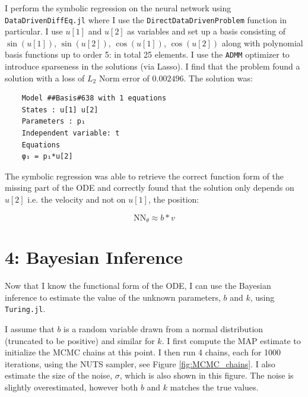 \documentclass[10pt,a4paper]{article}
\begin{document}
I perform the symbolic regression on the neural network using \texttt{DataDrivenDiffEq.jl}
where I use the \texttt{DirectDataDrivenProblem} function in particular.
I use $u[1]$ and $u[2]$ as variables and set up a basis consisting of
$\sin(u[1])$, $\sin(u[2])$, $\cos(u[1])$, $\cos(u[2])$ along with
polynomial basis functions up to order 5: in total 25 elements.
I use the \texttt{ADMM} optimizer to introduce sparseness in the solutions (via Lasso).
I find that the problem found a solution with a loss of $L_2$ Norm error of $0.002496$.
The solution was:
\begin{verbatim}
    Model ##Basis#638 with 1 equations
    States : u[1] u[2]
    Parameters : p₁
    Independent variable: t
    Equations
    φ₁ = p₁*u[2]
\end{verbatim}

The symbolic regression was able to retrieve the correct function form of the
missing part of the ODE and correctly found that the solution only depends on
$u[2]$ i.e. the velocity and not on $u[1]$, the position:

\begin{equation}
    \mathrm{NN}_\theta \approx b * v
\end{equation}

\section*{4: Bayesian Inference}

Now that I know the functional form of the ODE, I can use the Bayesian inference
to estimate the value of the unknown parameters, $b$ and $k$, using \texttt{Turing.jl}.

I assume that $b$ is a random variable drawn from a normal distribution (truncated to be positive)
and similar for $k$. I first compute the MAP estimate to initialize the MCMC chains at this point.
I then run 4 chains, each for 1000 iterations, using the NUTS sampler, see Figure \ref{fig:MCMC_chains}.
I also estimate the size of the noise, $\sigma$, which is also shown in this figure.
The noise is slightly overestimated, however both $b$ and $k$ matches the true values.
\end{document}
